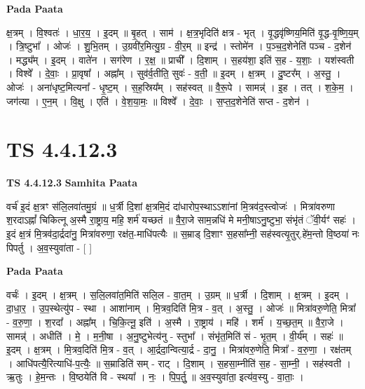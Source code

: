 \documentclass[17pt]{extarticle}
\begin{document}
\textbf{Pada Paata} \newline

क्ष॒त्रम् । वि॒श्वतः॑ । धा॒र॒य॒ । इ॒दम् ॥ बृ॒हत् । साम॑ । क्ष॒त्र॒भृदिति॑ क्षत्र - भृत् । वृ॒द्धवृ॑ष्णिय॒मिति॑ वृ॒द्ध-वृ॒ष्णि॒य॒म् । त्रि॒ष्टुभा᳚ । ओजः॑ । शु॒भि॒तम् । उ॒ग्रवी॑र॒मित्यु॒ग्र - वी॒र॒म् ॥ इन्द्र॑ । स्तोमे॑न । प॒ञ्च॒द॒शेनेति॑ पञ्च - द॒शेन॑ । मद्ध्य᳚म् । इ॒दम् । वाते॑न । सग॑रेण । र॒क्ष॒ ॥ प्राची᳚ । दि॒शाम् । स॒हय॑शा॒ इति॑ स॒ह - य॒शाः॒ । यश॑स्वती । विश्वे᳚ । दे॒वाः॒ । प्रा॒वृषा᳚ । अह्ना᳚म् । सुव॑र्व॒तीति॒ सुवः॑ - व॒ती॒ ॥ इ॒दम् । क्ष॒त्रम् । दु॒ष्टर᳚म् । अ॒स्तु॒ । ओजः॑ । अना॑धृष्ट॒मित्यना᳚ - धृ॒ष्ट॒म् । स॒ह॒स्रिय᳚म् । सह॑स्वत् ॥ वै॒रू॒पे । सामन्न्॑ । इ॒ह । तत् । श॒के॒म॒ । जग॑त्या । ए॒न॒म् । वि॒क्षु । एति॑ । वे॒श॒या॒मः॒ ॥ विश्वे᳚ । दे॒वाः॒ । स॒प्त॒द॒शेनेति॑ सप्त - द॒शेन॑ ।  \newline





\section{ TS 4.4.12.3 }

\textbf{TS 4.4.12.3 } \newline
\textbf{Samhita Paata} \newline

वर्च॑ इ॒दं क्ष॒त्रꣳ स॑लि॒लवा॑तमु॒ग्रं ॥ ध॒र्त्री दि॒शां क्ष॒त्रमि॒दं दा॑धारोप॒स्थाऽऽशा॑नां मि॒त्रव॑द॒स्त्वोजः॑ । मित्रा॑वरुणा श॒रदाऽह्नां᳚ चिकित्नू अ॒स्मै रा॒ष्ट्राय॒ महि॒ शर्म॑ यच्छतं ॥ वै॒रा॒जे साम॒न्नधि॑ मे मनी॒षाऽनु॒ष्टुभा॒ संभृ॑तं ॅवी॒र्यꣳ॑ सहः॑ । इ॒दं क्ष॒त्रं मि॒त्रव॑दा॒र्द्रदा॑नु॒ मित्रा॑वरुणा॒ रक्ष॑त॒-माधि॑पत्यैः ॥ स॒म्राड् दि॒शाꣳ स॒हसा᳚म्नी॒ सह॑स्वत्यृ॒तुर्.हे॑म॒न्तो वि॒ष्ठया॑ नः पिपर्तु । अ॒व॒स्युवा॑ता - [  ] \newline

\textbf{Pada Paata} \newline

वर्चः॑ । इ॒दम् । क्ष॒त्रम् । स॒लि॒लवा॑त॒मिति॑ सलि॒ल - वा॒त॒म् । उ॒ग्रम् ॥ ध॒र्त्री । दि॒शाम् । क्ष॒त्रम् । इ॒दम् । दा॒धा॒र॒ । उ॒प॒स्थेत्यु॑प - स्था । आशा॑नाम् । मि॒त्रव॒दिति॑ मि॒त्र - व॒त् । अ॒स्तु॒ । ओजः॑ ॥ मित्रा॑वरु॒णेति॒ मित्रा᳚ - व॒रु॒णा॒ । श॒रदा᳚ । अह्ना᳚म् । चि॒कि॒त्नू॒ इति॑ । अ॒स्मै । रा॒ष्ट्राय॑ । महि॑ । शर्म॑ । य॒च्छ॒त॒म् ॥ वै॒रा॒जे । सामन्न्॑ । अधीति॑ । मे॒ । म॒नी॒षा । अ॒नु॒ष्टुभेत्य॑नु - स्तुभा᳚ । संभृ॑त॒मिति॑ सं - भृ॒त॒म् । वी॒र्य᳚म् । सहः॑ ॥ इ॒दम् । क्ष॒त्रम् । मि॒त्रव॒दिति॑ मि॒त्र - व॒त् । आ॒र्द्रदा॒न्वित्या॒र्द्र - दा॒नु॒ । मित्रा॑वरु॒णेति॒ मित्रा᳚ - व॒रु॒णा॒ । रक्ष॑तम् । आधि॑पत्यै॒रित्याधि॑-प॒त्यैः॒ ॥ स॒म्राडिति॑ सम् - राट् । दि॒शाम् । स॒हसा॒म्नीति॑ स॒ह - सा॒म्नी॒ । सह॑स्वती । ऋ॒तुः । हे॒म॒न्तः । वि॒ष्ठयेति॑ वि - स्थया᳚ । नः॒ । पि॒प॒र्तु॒ ॥ अ॒व॒स्युवा॑ता॒ इत्य॑व॒स्यु - वा॒ताः॒ ।  \newline
\end{document}
